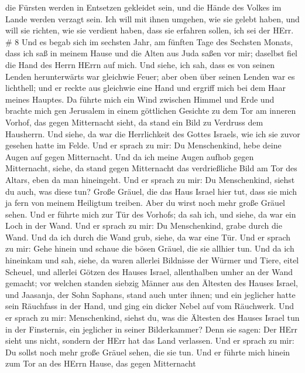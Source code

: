 die Fürsten werden in Entsetzen gekleidet sein, und die Hände des Volkes
im Lande werden verzagt sein. Ich will mit ihnen umgehen, wie sie gelebt
haben, und will sie richten, wie sie verdient haben, dass sie erfahren
sollen, ich sei der HErr. \# 8  Und es begab sich im
sechsten Jahr, am fünften Tage des Sechsten Monats, dass ich saß in
meinem Hause und die Alten aus Juda saßen vor mir; daselbst fiel die
Hand des Herrn HErrn auf mich.  Und siehe, ich sah, dass es
von seinen Lenden herunterwärts war gleichwie Feuer; aber oben über
seinen Lenden war es lichthell;  und er reckte aus gleichwie
eine Hand und ergriff mich bei dem Haar meines Hauptes. Da führte mich
ein Wind zwischen Himmel und Erde und brachte mich gen Jerusalem in
einem göttlichen Gesichte zu dem Tor am inneren Vorhof, das gegen
Mitternacht sieht, da stand ein Bild zu Verdruss dem Hausherrn.
 Und siehe, da war die Herrlichkeit des Gottes Israels, wie
ich sie zuvor gesehen hatte im Felde.  Und er sprach zu mir:
Du Menschenkind, hebe deine Augen auf gegen Mitternacht. Und da ich
meine Augen aufhob gegen Mitternacht, siehe, da stand gegen Mitternacht
das verdrießliche Bild am Tor des Altars, eben da man hineingeht.
 Und er sprach zu mir: Du Menschenkind, siehst du auch, was
diese tun? Große Gräuel, die das Haus Israel hier tut, dass sie mich ja
fern von meinem Heiligtum treiben. Aber du wirst noch mehr große Gräuel
sehen.  Und er führte mich zur Tür des Vorhofs; da sah ich,
und siehe, da war ein Loch in der Wand.  Und er sprach zu
mir: Du Menschenkind, grabe durch die Wand. Und da ich durch die Wand
grub, siehe, da war eine Tür.  Und er sprach zu mir: Gehe
hinein und schaue die bösen Gräuel, die sie allhier tun. 
Und da ich hineinkam und sah, siehe, da waren allerlei Bildnisse der
Würmer und Tiere, eitel Scheuel, und allerlei Götzen des Hauses Israel,
allenthalben umher an der Wand gemacht;  vor welchen
standen siebzig Männer aus den Ältesten des Hauses Israel, und Jaasanja,
der Sohn Saphans, stand auch unter ihnen; und ein jeglicher hatte sein
Räuchfass in der Hand, und ging ein dicker Nebel auf vom Räuchwerk.
 Und er sprach zu mir: Menschenkind, siehst du, was die
Ältesten des Hauses Israel tun in der Finsternis, ein jeglicher in
seiner Bilderkammer? Denn sie sagen: Der HErr sieht uns nicht, sondern
der HErr hat das Land verlassen.  Und er sprach zu mir: Du
sollst noch mehr große Gräuel sehen, die sie tun.  Und er
führte mich hinein zum Tor an des HErrn Hause, das gegen Mitternacht
